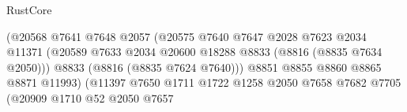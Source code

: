 \begin{lexlean}{RustCore}
\begin{coremodule}
                                                        (@20568
                                                          @7641
                                                          @7648
                                                          @2057
                                                          (@20575
                                                            @7640
                                                            @7647
                                                            @2028
                                                            @7623
                                                            @2034
                                                            @11371
                                                            (@20589
                                                              @7633
                                                              @2034
                                                              @20600
                                                              @18288
                                                              @8833
                                                              (@8816 (@8835 @7634 @2050)))
                                                            @8833
                                                            (@8816 (@8835 @7624 @7640)))
                                                          @8851
                                                          @8855
                                                          @8860
                                                          @8865
                                                          @8871
                                                          @11993)
                                                        (@11397
                                                          @7650
                                                          @1711
                                                          @1722
                                                          @1258
                                                          @2050
                                                          @7658
                                                          @7682
                                                          @7705
                                                          (@20909
                                                            @1710
                                                            @52
                                                            @2050
                                                            @7657

\end{coremodule}
\end{lexlean}
